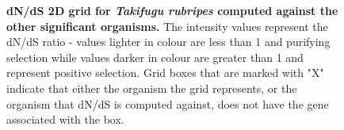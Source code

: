 \documentclass{article}
\begin{document}
\begin{figure}[H]
\centering
{}
\caption{\textbf{dN/dS 2D grid for \textit{Takifugu rubripes} computed against the other significant organisms.} The intensity values represent the dN/dS ratio - values lighter in colour are less than 1 and purifying selection while values darker in colour are greater than 1 and represent positive selection. Grid boxes that are marked with "X" indicate that either the organism the grid represents, or the organism that dN/dS is computed against, does not have the gene associated with the box.}
\label{sup_fig_33}
\end{figure}
\end{document}
